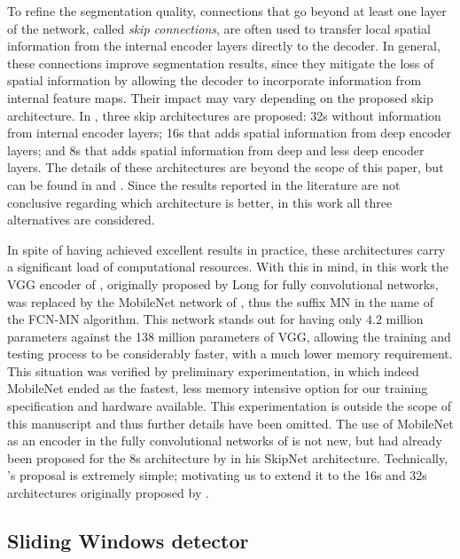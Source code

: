 \documentclass[a4paper,authoryear,review]{elsarticle}
\begin{document}
	To refine the segmentation quality, connections that go beyond at least one layer of the network, called \emph{skip connections}, are often used to transfer local spatial information from the internal encoder layers directly to the decoder. In general, these connections improve segmentation results, since they mitigate the loss of spatial information by allowing the decoder to incorporate information from internal feature maps. Their impact may vary depending on the proposed skip architecture. In \citet{long2015fully}, three skip architectures are proposed: 32s without information from internal encoder layers; 16s that adds spatial information from deep encoder layers; and 8s that adds spatial information from deep and less deep encoder layers. The details of these architectures are beyond the scope of this paper, but can be found in \citet{long2015fully} and \citet{shelhamer2017fully}. Since the results reported in the literature are not conclusive regarding which architecture is better, in this work all three alternatives are considered.
	
	In spite of having achieved excellent results in practice, these architectures carry a significant load of computational resources. With this in mind, in this work the VGG encoder of \citet{Simonyan2015VeryDC}, originally proposed by Long for fully convolutional networks, was replaced by the MobileNet network of \citet{howard2017mobilenets},  thus the suffix MN in the name of the FCN-MN algorithm. This network stands out for having only $4.2$ million parameters against the 138 million parameters of VGG, allowing the training and testing process to be considerably faster, with a much lower memory requirement.
	This situation was verified by preliminary experimentation, in which indeed MobileNet ended as the fastest, less memory intensive option for our training specification and hardware available. This experimentation is outside the scope of this manuscript and thus further details have been omitted. The use of MobileNet as an encoder in the fully convolutional networks of \citet{long2015fully} is not new, but had already been proposed for the 8s architecture by \citet{siam2018rtseg} in his SkipNet architecture. Technically, \citet{siam2018rtseg}’s proposal is extremely simple; motivating us to extend it to the 16s and 32s architectures originally proposed by \citep{long2015fully}. 
	
	\subsection{Sliding Windows detector}
	\label{sec:sw}
	
\end{document}
